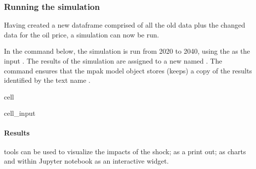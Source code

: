 \documentclass[letterpaper,10pt,english]{jupyterBook}
\begin{document}
\subsubsection{Running the simulation}
\label{\detokenize{content/05_WBModels/ScenarioAnalysis:running-the-simulation}}
\sphinxAtStartPar
Having created a new dataframe comprised of all the old data plus the changed data for the oil price, a simulation can now be run.

\sphinxAtStartPar
In the command below, the simulation is run from 2020 to 2040, using the  as the input .  The results of the simulation are assigned to a new   named .  The  command ensures that the mpak model object stores (keeps) a copy of the results identified by the text name .

\begin{sphinxuseclass}{cell}\begin{sphinxVerbatimInput}

\begin{sphinxuseclass}{cell_input}
\begin{sphinxVerbatim}[commandchars=\\\{\}]
   
\end{sphinxVerbatim}

\end{sphinxuseclass}\end{sphinxVerbatimInput}

\end{sphinxuseclass}

\paragraph{Results}
\label{\detokenize{content/05_WBModels/ScenarioAnalysis:results}}
\sphinxAtStartPar
{} tools can be used to visualize the impacts of the shock; as a print out; as charts and within Jupyter notebook as an interactive widget.
\end{document}
